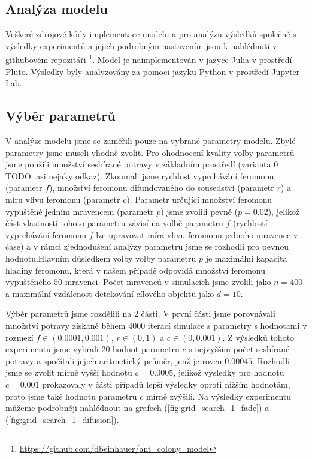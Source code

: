 \documentclass[10pt,a4paper,twocolumn]{article}
\begin{document}
\subsection{Analýza modelu}

Veškeré zdrojové kódy implementace modelu a pro analýzu výsledků společně s
výsledky experimentů a jejich podrobným nastavením jsou k nahlédnutí v 
githubovém repozitáři 
\footnote{\url{https://github.com/dbeinhauer/ant_colony_model}}. Model je 
naimplementován v jazyce Julia v prostředí Pluto. Výsledky byly analyzovány
za pomoci jazyku Python v prostředí Jupyter Lab.

\subsection{Výběr parametrů}
V analýze modelu jsme se zaměřili pouze na vybrané parametry modelu. Zbylé
parametry jsme museli vhodně zvolit. Pro ohodnocení kvality volby
parametrů jsme použili množství sesbírané potravy v základním prostředí
(varianta 0 TODO: asi nejaky odkaz). Zkoumali jsme rychlost 
vyprchávání feromonu (parametr $f$), množství feromonu difundovaného do 
sousedství (parametr $r$) a míru vlivu feromonu (parametr $c$). Parametr
určující množství feromonu vypuštěné jedním mravencem (parametr $p$) jsme
zvolili pevně ($p = 0.02$), jelikož část vlastností tohoto parametru závisí
na volbě parametru $f$ (rychlostí vyprchávání feromonu $f$ lze upravovat
míra vlivu feromonu jednoho mravence v čase) a v rámci zjednodušení analýzy
parametrů jsme se rozhodli pro pevnou hodnotu.Hlavním důsledkem volby 
volby parametru $p$ je maximální kapacita hladiny feromonu, která v našem 
případě odpovídá množství feromonu vypuštěného $50$ mravenci. Počet 
mravenců v simulacích jsme zvolili jako $n = 400$ a maximální vzdálenost 
detekování cílového objektu jako $d = 10$. 

Výběr parametrů jsme rozdělili na 2 části. V první části jsme porovnávali
množství potravy získané během $4000$ iterací simulace s parametry s 
hodnotami v rozmezí $f \in (0.0001, 0.001)$, $r \in (0, 1)$ a 
$c \in (0, 0.001)$. Z výsledků tohoto experimentu jsme vybrali 20 
hodnot parametru $c$ s nejvyšším počet sesbírané potravy a spočítali 
jejich aritmetický průměr, jenž je roven $0.00045$. Rozhodli jsme se 
zvolit mírně vyšší hodnotu $c = 0.0005$, jelikož výsledky pro hodnotu 
$c=0.001$ prokazovaly v části případů lepší výsledky oproti nižším hodnotám, 
proto jsme také hodnotu parametru $c$ mírně zvýšili. Na výsledky experimentu
můžeme podrobněji nahlédnout na grafech (\ref{fig:grid_search_1_fade}) a 
(\ref{fig:grid_search_1_difusion}).
\end{document}
